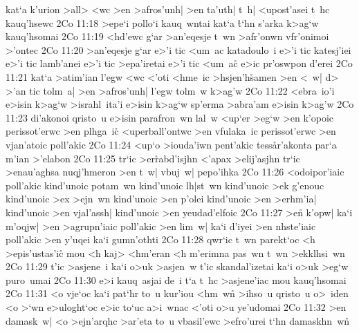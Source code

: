 kat`a
k'urion
>all>
<wc
>en
>afros'unh|
>en
ta'uth|
t~h|
<upost'asei
t~hc
kauq'hsewc\bibvsend
\vs 2Co 11:18
>epe`i
pollo`i
kauq~wntai
kat`a
\r{t}`hn
s'arka
k>ag`w
kauq'hsomai\bibvsend
\vs 2Co 11:19
<hd'ewc
g`ar
>an'eqesje
t~wn
>afr'onwn
vfr'onimoi
>'ontec\bibvsend
\vs 2Co 11:20
>an'eqesje
g`ar
e>'i
tic
<um~ac
katadoulo~i
e>'i
tic
katesj'iei
e>'i
tic
lamb'anei
e>'i
tic
>epa'iretai
e>'i
tic
<um~ac\r{}
e>ic
pr'oswpon
d'erei\bibvsend
\vs 2Co 11:21
kat`a
>atim'ian
l'egw
<wc
<'oti
<hme~ic
>hsjen'h\r{s}amen
>en
<~w|
d>
>'an
tic
tolm~a|
>en
>afros'unh|
l'egw
tolm~w
k>ag'w\bibvsend
\vs 2Co 11:22
<ebra~io'i
e>isin
k>ag`w
>israhl~ita'i
e>isin
k>ag`w
sp'erma
>abra'am
e>isin
k>ag'w\bibvsend
\vs 2Co 11:23
di'akonoi
qristo~u
e>isin
parafron~wn
lal~w
<up`er
>eg`w
>en
k'opoic
perissot'erwc
>en
plhga~ic\r{}
<uperball'ontwc
>en
vfulaka~ic
perissot'erwc
>en
vjan'atoic
poll'akic\bibvsend
\vs 2Co 11:24
<up`o
>iouda'iwn
pent'akic
tess\r{a}r'akonta
par`a
m'ian
>'elabon\bibvsend
\vs 2Co 11:25
tr`ic
>er\r{r}abd'isjhn
<'apax
>elij'asjhn
tr`ic
>enau'aghsa
nuqj'hmeron
>en
t~w|
vbuj~w|
pepo'ihka\bibvsend
\vs 2Co 11:26
<odoipor'iaic
poll'akic
kind'unoic
potam~wn
kind'unoic
lh|st~wn
kind'unoic
>ek
g'enouc
kind'unoic
>ex
>ejn~wn
kind'unoic
>en
p'olei
kind'unoic
>en
>erhm'ia|
kind'unoic
>en
vjal'assh|
kind'unoic
>en
yeudad'elfoic\bibvsend
\vs 2Co 11:27
>e\r{n}
k'opw|
ka`i
m'oqjw|
>en
>agrupn'iaic
poll'akic
>en
lim~w|
ka`i
d'iyei
>en
nhste'iaic
poll'akic
>en
y'uqei
ka`i
gumn'othti\bibvsend
\vs 2Co 11:28
qwr`ic
t~wn
parekt`oc
<h
>epis'ustas'ic\r{}
mou
<h
kaj>
<hm'eran
<h
m'erimna
pas~wn
t~wn
>ekklhsi~wn\bibvsend
\vs 2Co 11:29
t'ic
>asjene~i
ka`i
o>uk
>asjen~w
t'ic
skandal'izetai
ka`i
o>uk
>eg`w
puro~umai\bibvsend
\vs 2Co 11:30
e>i
kauq~asjai
de~i
t`a
t~hc
>asjene'iac
mou
kauq'hsomai\bibvsend
\vs 2Co 11:31
<o
vje`oc
ka`i
pat`hr
to~u
kur'iou
<hm~wn\r{}
>ihso~u
qristo~u
o>~iden
<o
>`wn
e>uloght`oc
e>ic
to`uc
a>i~wnac
<'oti
o>u
ye'udomai\bibvsend
\vs 2Co 11:32
>en
damask~w|
<o
>ejn'arqhc
>ar'eta
to~u
vbasil'ewc
>efro'urei
t`hn
damaskhn~wn\r{}
